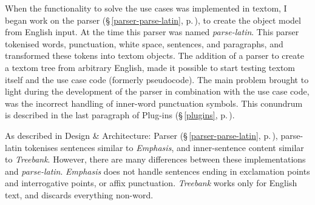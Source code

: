 When the functionality to solve the use cases was implemented in \gls{textom},
  I began work on the parser (§\,\ref{parser-parse-latin},
  p.\,\pageref{parser-parse-latin}), to create the object model from
  English input.
At the time this parser was named \emph{parse-latin}.
This parser tokenised words, punctuation, white space, sentences, and
  paragraphs, and transformed these tokens into \gls{textom} objects.
The addition of a parser to create a \gls{textom} tree from arbitrary
  English, made it possible to start testing \gls{textom} itself and the use
  case code (formerly pseudocode).
The main problem brought to light during the development of the parser in
  combination with the use case code, was the incorrect
  handling of inner-word punctuation symbols.
This conundrum is described in the last paragraph of Plug-ins
  (§\,\ref{plugins}, p.\,\pageref{plugins}).

As described in Design \& Architecture: Parser (§\,\ref{parser-parse-latin},
  p.\,\pageref{parser-parse-latin}), \gls{parse-latin} tokenises sentences
  similar to \emph{Emphasis}, and inner-sentence content similar
  to \emph{Treebank}.
However, there are many differences between these implementations and
  \emph{parse-latin}.
\emph{Emphasis} does not handle sentences ending in exclamation
  points and interrogative points, or affix punctuation.
\emph{Treebank} works only for English text, and discards everything non-word.




% 

\endgroup
